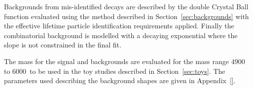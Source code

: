 Backgrounds from mis-identified \bhh decays are described by the double Crystal Ball function evaluated using the method described in Section~\ref{sec:backgrounds} with the effective lifetime particle identification requirements applied. Finally the combinatorial background is modelled with a decaying exponential where the slope is not constrained in the final fit.

The mass \pdfs for the signal and backgrounds are evaluated for the mass range 4900 to 6000~\mevcc to be used in the toy studies described in Section~\ref{sec:toys}. The parameters used describing the background shapes are given in Appendix~\ref{}.


